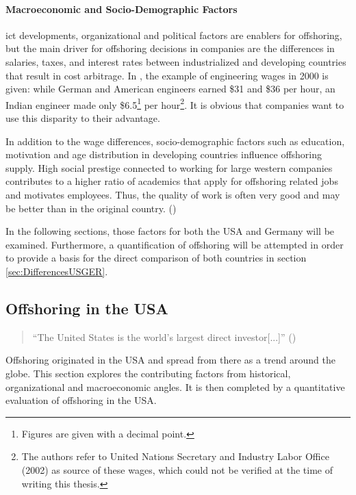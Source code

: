 \paragraph{Macroeconomic and Socio-Demographic Factors}
\Gls{ict} developments, organizational and political factors are enablers for offshoring, but the main driver for offshoring decisions in companies are the differences in salaries, taxes, and interest rates between industrialized and developing countries that result in cost arbitrage. In \cite[p. 89]{Jahns.2007}, the example of engineering wages in 2000 is given: while German and American engineers earned \$31 and \$36 per hour, an Indian engineer made only \$6.5\footnote{Figures are given with a decimal point.} per hour\footnote{The authors refer to United Nations Secretary and Industry Labor Office (2002) as source of these wages, which could not be verified at the time of writing this thesis.}. It is obvious that companies want to use this disparity to their advantage.

In addition to the wage differences, socio-demographic factors such as education, motivation and age distribution in developing countries influence offshoring supply. High social prestige connected to working for large western companies contributes to a higher ratio of academics that apply for offshoring related jobs and motivates employees. Thus, the quality of work is often very good and may be better than in the original country. (\cite[p. 93]{Jahns.2007})

In the following sections, those factors for both the USA and Germany will be examined. Furthermore, a quantification of offshoring will be attempted in order to provide a basis for the direct comparison of both countries in section \ref{sec:DifferencesUSGER}.

\subsection{Offshoring in the USA}
\label{sec:OffshoringUS}

\begin{quote}
	``The United States is the world's largest direct investor[...]'' \linebreak(\cite[p. 3]{Kozlow.2006})
\end{quote}

Offshoring originated in the USA and spread from there as a trend around the globe. This section explores the contributing factors from historical, organizational and macroeconomic angles. It is then completed by a quantitative evaluation of offshoring in the USA.

